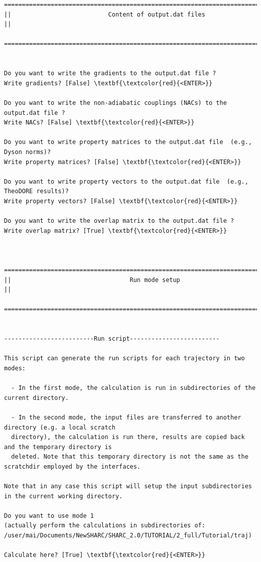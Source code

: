 \documentclass[a4paper,11pt,DIV=15,openany]{scrbook}
\begin{document}
\begin{oframed}
\begin{Verbatim}[commandchars=\\\{\}]
  ================================================================================
||                           Content of output.dat files                          ||
  ================================================================================


Do you want to write the gradients to the output.dat file ?
Write gradients? [False] \textbf{\textcolor{red}{<ENTER>}}

Do you want to write the non-adiabatic couplings (NACs) to the output.dat file ?
Write NACs? [False] \textbf{\textcolor{red}{<ENTER>}}

Do you want to write property matrices to the output.dat file  (e.g., Dyson norms)?
Write property matrices? [False] \textbf{\textcolor{red}{<ENTER>}}

Do you want to write property vectors to the output.dat file  (e.g., TheoDORE results)?
Write property vectors? [False] \textbf{\textcolor{red}{<ENTER>}}

Do you want to write the overlap matrix to the output.dat file ?
Write overlap matrix? [True] \textbf{\textcolor{red}{<ENTER>}}


  ================================================================================
||                                 Run mode setup                                 ||
  ================================================================================


-------------------------Run script-------------------------

This script can generate the run scripts for each trajectory in two modes:

  - In the first mode, the calculation is run in subdirectories of the current directory.

  - In the second mode, the input files are transferred to another directory (e.g. a local scratch 
  directory), the calculation is run there, results are copied back and the temporary directory is 
  deleted. Note that this temporary directory is not the same as the scratchdir employed by the interfaces.

Note that in any case this script will setup the input subdirectories in the current working directory.

Do you want to use mode 1 
(actually perform the calculations in subdirectories of: 
/user/mai/Documents/NewSHARC/SHARC_2.0/TUTORIAL/2_full/Tutorial/traj)

Calculate here? [True] \textbf{\textcolor{red}{<ENTER>}}


\end{Verbatim}
\end{oframed}
\end{document}
